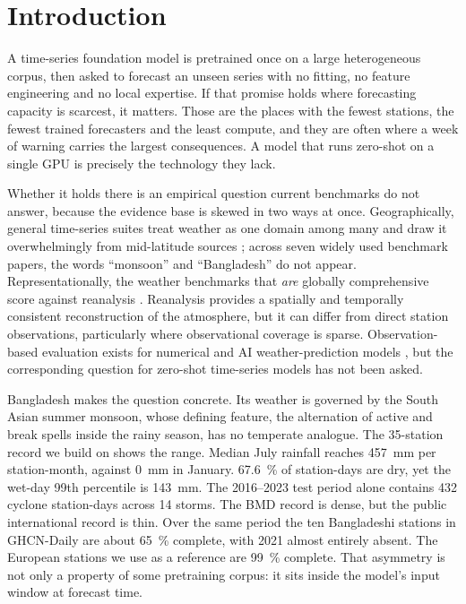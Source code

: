 \section{Introduction}
\label{sec:intro}

A time-series foundation model is pretrained once on a large heterogeneous corpus, then asked to forecast an
unseen series with no fitting, no feature engineering and no local expertise. If that promise holds where
forecasting capacity is scarcest, it matters. Those are the places with the fewest stations, the fewest trained
forecasters and the least compute, and they are often where a week of warning carries the largest consequences.
A model that runs zero-shot on a single GPU is precisely the technology they lack.

Whether it holds there is an empirical question current benchmarks do not answer, because the evidence base is
skewed in two ways at once. Geographically, general time-series suites treat weather as one domain among many and
draw it overwhelmingly from mid-latitude sources \citep{godahewa2021monash,aksu2024gifteval,qiu2024tfb,li2025tsfmbench};
across seven widely used benchmark papers, the words ``monsoon'' and ``Bangladesh'' do not appear. Representationally,
the weather benchmarks that \emph{are} globally comprehensive score against reanalysis
\citep{rasp2024weatherbench2,nathaniel2024chaosbench}. Reanalysis provides a spatially and temporally consistent reconstruction of the atmosphere, but it can differ
from direct station observations, particularly where observational coverage is sparse. Observation-based
evaluation exists for numerical and AI weather-prediction models \citep{jin2024weatherreal,gupta2026mausam}, but the
corresponding question for zero-shot time-series models has not been asked.

Bangladesh makes the question concrete. Its weather is governed by the South Asian summer monsoon, whose defining
feature, the alternation of active and break spells inside the rainy season, has no temperate analogue. The 35-station
record we build on shows the range. Median July rainfall reaches \SI{457}{\milli\metre} per station-month, against
\SI{0}{\milli\metre} in January. \SI{67.6}{\percent} of station-days are dry, yet the wet-day 99th percentile
is \SI{143}{\milli\metre}. The 2016--2023 test period alone contains 432 cyclone station-days across 14 storms. The
BMD record is dense, but the public international record is thin. Over the same period the ten Bangladeshi stations
in GHCN-Daily are about \SI{65}{\percent} complete, with 2021 almost entirely absent. The European stations we use as a
reference are \SI{99}{\percent} complete. That asymmetry is not only a property of some pretraining corpus: it sits inside
the model's input window at forecast time.


